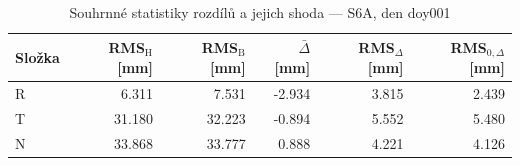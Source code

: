 \begin{table}[H]
\centering
\caption{Souhrnné statistiky rozdílů a jejich shoda — S6A, den doy001}
\label{tab:hermite_vs_bernese_s6a_doy001_summary}
\begin{tabular}{lrrrrr}
\toprule
Složka & RMS$_\mathrm{H}$ [mm] & RMS$_\mathrm{B}$ [mm] & $\bar{\Delta}$ [mm] & RMS$_{\Delta}$ [mm] & RMS$_{0,\Delta}$ [mm] \\
\midrule
R & 6.311 & 7.531 & -2.934 & 3.815 & 2.439 \\
T & 31.180 & 32.223 & -0.894 & 5.552 & 5.480 \\
N & 33.868 & 33.777 & 0.888 & 4.221 & 4.126 \\
\bottomrule
\end{tabular}
\end{table}
